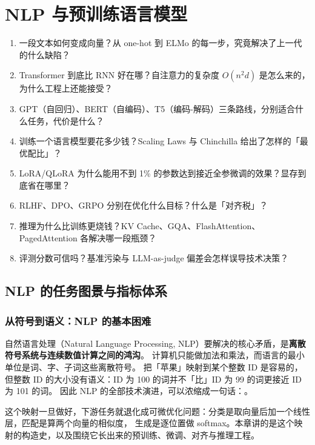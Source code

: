 \chapter{NLP 与预训练语言模型}
\label{ch:nlp}

\begin{insight}[本章要解决的问题]
\begin{enumerate}
  \item 一段文本如何变成向量？从 one-hot 到 ELMo 的每一步，究竟解决了上一代的什么缺陷？
  \item Transformer 到底比 RNN 好在哪？自注意力的复杂度 $O(n^2 d)$ 是怎么来的，为什么工程上还能接受？
  \item GPT（自回归）、BERT（自编码）、T5（编码-解码）三条路线，分别适合什么任务，代价是什么？
  \item 训练一个语言模型要花多少钱？Scaling Laws 与 Chinchilla 给出了怎样的「最优配比」？
  \item LoRA/QLoRA 为什么能用不到 1\% 的参数达到接近全参微调的效果？显存到底省在哪里？
  \item RLHF、DPO、GRPO 分别在优化什么目标？什么是「对齐税」？
  \item 推理为什么比训练更烧钱？KV Cache、GQA、FlashAttention、PagedAttention 各解决哪一段瓶颈？
  \item 评测分数可信吗？基准污染与 LLM-as-judge 偏差会怎样误导技术决策？
\end{enumerate}
\end{insight}

\section{NLP 的任务图景与指标体系}

\subsection{从符号到语义：NLP 的基本困难}

自然语言处理（Natural Language Processing, NLP）要解决的核心矛盾，是\textbf{离散符号系统与连续数值计算之间的鸿沟}。
计算机只能做加法和乘法，而语言的最小单位是词、字、子词这些离散符号。
把「苹果」映射到某个整数 ID 是容易的，但整数 ID 的大小没有语义：ID 为 100 的词并不「比」ID 为 99 的词更接近 ID 为 101 的词。
因此 NLP 的全部技术演进，可以浓缩成一句话：。

这个映射一旦做好，下游任务就退化成可微优化问题：分类是取向量后加一个线性层，匹配是算两个向量的相似度，
生成是逐位置做 softmax。本章讲的是这个映射的构造史，以及围绕它长出来的预训练、微调、对齐与推理工程。

